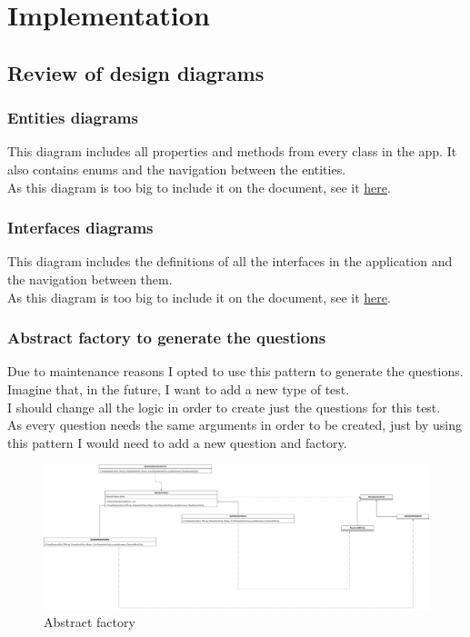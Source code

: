 \chapter{Implementation}

\section{Review of design diagrams}
    \subsection{Entities diagrams}
    This diagram includes all properties and methods from every class in the app. It also contains enums and the navigation between the entities. \\
    As this diagram is too big to include it on the document, see it \href{https://github.com/JesusGonzalezA/LearnASLDoc/blob/master/doc/assets/diagrams/interfaces.png}{here}.

    \subsection{Interfaces diagrams}
    This diagram includes the definitions of all the interfaces in the application and the navigation between them. \\
    As this diagram is too big to include it on the document, see it \href{https://github.com/JesusGonzalezA/LearnASLDoc/blob/master/doc/assets/diagrams/entities.png}{here}.

    \subsection{Abstract factory to generate the questions}
    Due to maintenance reasons I opted to use this pattern to generate the questions. Imagine that, in the future, I want to add a new type of test. \\
    I should change all the logic in order to create just the questions for this test. \\
    As every question needs the same arguments in order to be created, just by using this pattern I would need to add a new question and factory. 
        \newpage
        \begin{figure}[H]
            \centering
                \includegraphics[angle=90, width=\textwidth, height=\textheight]{assets/diagrams/abstractfactory.png}
            \caption{Abstract factory}
            \label{fig:implementation_af}
        \end{figure}

